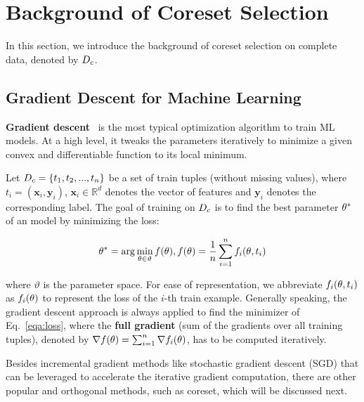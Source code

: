 \section{Background of Coreset Selection} 
\label{sec:pre}

In this section, we introduce the background of coreset selection on complete data, denoted by $D_c$.

\subsection{Gradient Descent for Machine Learning}

{\bf Gradient descent}~\cite{lemarechal2012cauchy} is the most typical optimization algorithm to train ML models. 
At a high level, it  tweaks the parameters iteratively to minimize a given convex and differentiable function to its local minimum.

Let $D_c = \{t_1, t_2, ..., t_n \}$ be a set of train tuples (without missing values), where $t_i = (\mathbf{x}_i, \mathbf{y}_i)$, $\mathbf{x}_i \in \mathbb{R}^d$ denotes the vector of features and $\mathbf{y}_i$ denotes the corresponding label. The goal of training on $D_c$ is to find the best parameter  $\theta^*$ of an model by minimizing the loss:

\vspace{-0.5em}
\begin{equation}\label{eqa:loss}
\theta^* = \arg\min_{\theta\in \vartheta}f(\theta), f(\theta)=\frac{1}{n}\sum_{i=1}^nf_i (\theta, t_i) 
\end{equation}

\noindent where $\vartheta$ is the parameter space. For ease of representation, we abbreviate $f_i (\theta, t_i)$ as $f_i(\theta)$ to represent the loss of the $i$-th train example.  Generally speaking, the gradient descent approach is always applied to find the minimizer of  Eq.~\ref{eqa:loss}, where  the {\bf full gradient} (sum of the gradients over all training tuples), denoted by $\nabla f(\theta) = \sum_{i=1}^{n}\nabla f_i(\theta)$, has to be computed iteratively. 

Besides incremental gradient methods like stochastic gradient descent (SGD) that can be leveraged to accelerate the iterative gradient computation, there are other popular and orthogonal methods, such as coreset, which will be discussed next.

